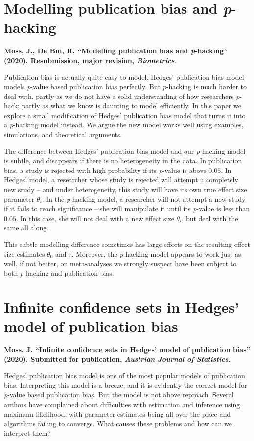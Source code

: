 \section{Modelling publication bias and \emph{p}-hacking}
\textbf{Moss, J., De Bin, R. ``Modelling publication bias and \emph{p}-hacking''
(2020). Resubmission, major revision, \emph{Biometrics.}}

Publication bias is actually quite easy to model. Hedges' publication bias model \parencite{Hedges1992-ue} models \textit{p}-value based publication bias perfectly. But \textit{p}-hacking is much harder to deal with, partly as we do not have a solid understanding of how researchers \textit{p}-hack; partly as what we know is daunting to model efficiently. In this paper we explore a small modification of Hedges' publication bias model that turns it into a \textit{p}-hacking model instead. We argue the new model works well using examples, simulations, and theoretical arguments. 

The difference between Hedges' publication bias model and our \textit{p}-hacking model is subtle, and disappears if there is no heterogeneity in the data. In publication bias, a study is rejected with high probability if its \textit{p}-value is above $0.05$. In Hedges' model, a researcher whose study is rejected will attempt a completely new study -- and under heterogeneity, this study will have its own true effect size parameter $\theta_i$. In the \textit{p}-hacking model, a researcher will not attempt a new study if it fails to reach significance -- she will manipulate it until its \textit{p}-value is less than $0.05$. In this case, she will not deal with a new effect size $\theta_i$, but deal with the same all along.

This subtle modelling difference sometimes has large effects on the resulting effect size estimates $\theta_0$ and $\tau$. Moreover, the \textit{p}-hacking model appears to work just as well, if not better, on meta-analyses we strongly suspect have been subject to both \textit{p}-hacking and publication bias.

\section{Infinite confidence sets in Hedges' model of publication
bias}
\textbf{Moss, J. ``Infinite confidence sets in Hedges' model of publication
bias'' (2020). Submitted for publication, \emph{Austrian Journal of Statistics.}
}

Hedges' publication bias model is one of the most popular models of publication bias. Interpreting this model is a breeze, and it is evidently the correct model for \textit{p}-value based publication bias. But the model is not above reproach. Several authors have complained about difficulties with estimation and inference using maximum likelihood, with parameter estimates being all over the place and algorithms failing to converge. What causes these problems and how can we interpret them?

